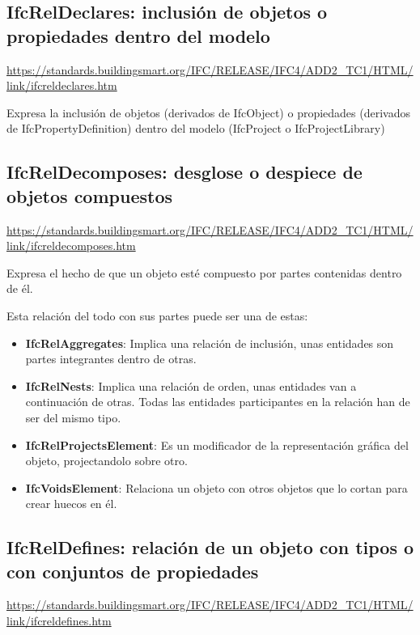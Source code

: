 \documentclass[spanish,12pt,a4paper,final,oneside]{book}
\begin{document}
\subsection{IfcRelDeclares: inclusión de objetos o propiedades dentro del modelo}
\url{https://standards.buildingsmart.org/IFC/RELEASE/IFC4/ADD2_TC1/HTML/link/ifcreldeclares.htm}

Expresa la inclusión de objetos (derivados de IfcObject) o propiedades (derivados de IfcPropertyDefinition) dentro del modelo (IfcProject o IfcProjectLibrary)



\subsection{IfcRelDecomposes: desglose o despiece de objetos compuestos}
\url{https://standards.buildingsmart.org/IFC/RELEASE/IFC4/ADD2_TC1/HTML/link/ifcreldecomposes.htm}

Expresa el hecho de que un objeto esté compuesto por partes contenidas dentro de él.

Esta relación del todo con sus partes puede ser una de estas:
\begin{itemize}

\item \textbf{IfcRelAggregates}: Implica una relación de inclusión, unas entidades son partes integrantes dentro de otras.

\item \textbf{IfcRelNests}: Implica una relación de orden, unas entidades van a continuación de otras. Todas las entidades participantes en la relación han de ser del mismo tipo.

\item \textbf{IfcRelProjectsElement}: Es un modificador de la representación gráfica del objeto,  projectandolo sobre otro.

\item \textbf{IfcVoidsElement}: Relaciona un objeto con otros objetos que lo cortan para crear huecos en él.

\end{itemize}


\subsection{IfcRelDefines: relación de un objeto con tipos o con conjuntos de propiedades}
\url{https://standards.buildingsmart.org/IFC/RELEASE/IFC4/ADD2_TC1/HTML/link/ifcreldefines.htm}
\end{document}
